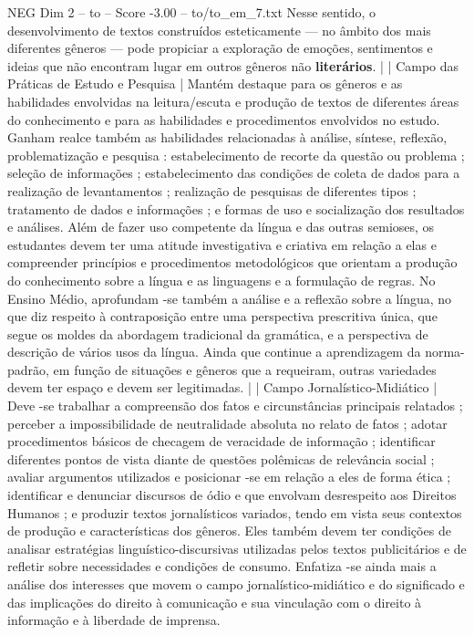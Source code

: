 \begin{textsample}{NEG Dim 2 – to – Score -3.00 – to/to\_em\_7.txt}
Nesse sentido, o desenvolvimento de textos construídos esteticamente — no âmbito dos mais diferentes gêneros — pode propiciar a exploração de emoções, sentimentos e ideias que não encontram lugar em outros gêneros não \textbf{literários}. | | Campo das Práticas de Estudo e Pesquisa | Mantém destaque para os gêneros e as habilidades envolvidas na leitura/escuta e produção de textos de diferentes áreas do conhecimento e para as habilidades e procedimentos envolvidos no estudo.
Ganham realce também as habilidades relacionadas à análise, síntese, reflexão, problematização e pesquisa : estabelecimento de recorte da questão ou problema ; seleção de informações ; estabelecimento das condições de coleta de dados para a realização de levantamentos ; realização de pesquisas de diferentes tipos ; tratamento de dados e informações ; e formas de uso e socialização dos resultados e análises.
Além de fazer uso competente da língua e das outras semioses, os estudantes devem ter uma atitude investigativa e criativa em relação a elas e compreender princípios e procedimentos metodológicos que orientam a produção do conhecimento sobre a língua e as linguagens e a formulação de regras.
No Ensino Médio, aprofundam -se também a análise e a reflexão sobre a língua, no que diz respeito à contraposição entre uma perspectiva prescritiva única, que segue os moldes da abordagem tradicional da gramática, e a perspectiva de descrição de vários usos da língua.
Ainda que continue a aprendizagem da norma-padrão, em função de situações e gêneros que a requeiram, outras variedades devem ter espaço e devem ser legitimadas. | | Campo Jornalístico-Midiático | Deve -se trabalhar a compreensão dos fatos e circunstâncias principais relatados ; perceber a impossibilidade de neutralidade absoluta no relato de fatos ; adotar procedimentos básicos de checagem de veracidade de informação ; identificar diferentes pontos de vista diante de questões polêmicas de relevância social ; avaliar argumentos utilizados e posicionar -se em relação a eles de forma ética ; identificar e denunciar discursos de ódio e que envolvam desrespeito aos Direitos Humanos ; e produzir textos jornalísticos variados, tendo em vista seus contextos de produção e características dos gêneros.
Eles também devem ter condições de analisar estratégias linguístico-discursivas utilizadas pelos textos publicitários e de refletir sobre necessidades e condições de consumo.
Enfatiza -se ainda mais a análise dos interesses que movem o campo jornalístico-midiático e do significado e das implicações do direito à comunicação e sua vinculação com o direito à informação e à liberdade de imprensa.

\end{textsample}
